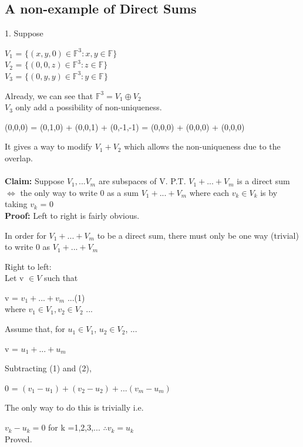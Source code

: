 \documentclass{article}
\begin{document}
\subsection{A non-example of Direct Sums}
1. Suppose
\begin{center}
    $V_1$ = $\{(x,y,0)\in \mathbb{F}^3: x,y \in \mathbb{F}\}$ \\
    $V_2$ = $\{(0,0,z)\in \mathbb{F}^3: z \in \mathbb{F}\}$ \\
    $V_3$ = $\{(0,y,y)\in \mathbb{F}^3: y \in \mathbb{F}\}$
\end{center}
Already, we can see that $\mathbb{F}^3 = V_1 \oplus V_2$ \\
$V_3$ only add a possibility of non-uniqueness.
\begin{center}
    (0,0,0) = (0,1,0) + (0,0,1) + (0,-1,-1)
            = (0,0,0) + (0,0,0) + (0,0,0)
\end{center}
It gives a way to modify $V_1 + V_2$ which allows the non-uniqueness due to the overlap. \\
\\
\textbf{Claim:} Suppose $V_1,...V_m$ are subspaces of V. P.T. $V_1+...+V_m$ is a direct sum $\iff$ the only way to write 0 as a sum $V_1+...+V_m$ where each $v_k \in V_k$ is by taking $v_k$ = 0 \\
\textbf{Proof:} Left to right is fairly obvious. 
\begin{center}
    In order for $V_1+...+V_m$ to be a direct sum, there must only be one way (trivial) to write 0 as $V_1+...+V_m$ \\
\end{center}
Right to left: \\
Let v $\in V$ such that 
\begin{center}
    v = $v_1+...+v_m$   ...(1) \\
    where $v_1 \in V_1, v_2 \in V_2$ ...
\end{center}
Assume that, for $u_1 \in V_1$, $u_2 \in V_2$, ...
\begin{center}
    v = $u_1+...+u_m$
\end{center}
Subtracting (1) and (2), \\
\begin{center}
    0 = $(v_1-u_1) + (v_2-u_2)+...(v_m-u_m)$
\end{center}
The only way to do this is trivially i.e. 
\begin{center}
    $v_k - u_k = 0$ for k =1,2,3,...
    $\therefore v_k = u_k$ \\
    Proved.
\end{center}
\end{document}
